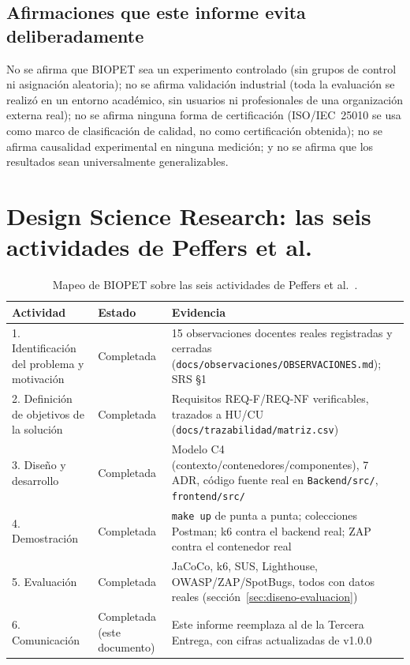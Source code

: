 \subsection*{Afirmaciones que este informe evita deliberadamente}
No se afirma que BIOPET sea un experimento controlado (sin grupos de
control ni asignaci\'on aleatoria); no se afirma validaci\'on industrial
(toda la evaluaci\'on se realiz\'o en un entorno acad\'emico, sin usuarios
ni profesionales de una organizaci\'on externa real); no se afirma ninguna
forma de certificaci\'on (ISO/IEC~25010 se usa como marco de
clasificaci\'on de calidad, no como certificaci\'on obtenida); no se afirma
causalidad experimental en ninguna medici\'on; y no se afirma que los
resultados sean universalmente generalizables.

\section{Design Science Research: las seis actividades de Peffers et al.}
\label{sec:dsr-peffers}

\begin{table}[H]
  \centering
  \small
  \caption{Mapeo de BIOPET sobre las seis actividades de Peffers et al.~\cite{peffers2007dsrm}.}
  \label{tab:peffers}
  \begin{tabular}{@{}p{3.2cm}p{1.6cm}p{7.8cm}@{}}
    \toprule
    Actividad & Estado & Evidencia \\
    \midrule
    1. Identificaci\'on del problema y motivaci\'on & Completada & 15 observaciones docentes reales registradas y cerradas (\texttt{docs/observaciones/OBSERVACIONES.md}); SRS \S1 \\
    2. Definici\'on de objetivos de la soluci\'on & Completada & Requisitos REQ-F/REQ-NF verificables, trazados a HU/CU (\texttt{docs/trazabilidad/matriz.csv}) \\
    3. Dise\~no y desarrollo & Completada & Modelo C4 (contexto/contenedores/componentes), 7 ADR, c\'odigo fuente real en \texttt{Backend/src/}, \texttt{frontend/src/} \\
    4. Demostraci\'on & Completada & \texttt{make up} de punta a punta; colecciones Postman; k6 contra el backend real; ZAP contra el contenedor real \\
    5. Evaluaci\'on & Completada & JaCoCo, k6, SUS, Lighthouse, OWASP/ZAP/SpotBugs, todos con datos reales (secci\'on~\ref{sec:diseno-evaluacion}) \\
    6. Comunicaci\'on & Completada (este documento) & Este informe reemplaza al de la Tercera Entrega, con cifras actualizadas de v1.0.0 \\
    \bottomrule
  \end{tabular}
\end{table}

